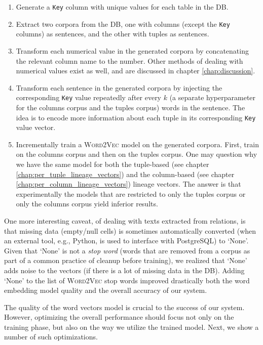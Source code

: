 \begin{enumerate}
    \item Generate a \texttt{Key} column with unique values for each table in the DB.
    \item Extract two corpora from the DB, one with columns (except the \texttt{Key} columns) as sentences, and the other with tuples as sentences.
    \item Transform each numerical value in the generated corpora by concatenating the relevant column name to the number. Other methods of dealing with numerical values exist as well, and are discussed in chapter \ref{chap:discussion}.
    \item Transform each sentence in the generated corpora by injecting the corresponding \texttt{Key} value repeatedly after every $k$ (a separate hyperparameter for the columns corpus and the tuples corpus) words in the sentence. The idea is to encode more information about each tuple in its corresponding \texttt{Key} value vector.
    \item Incrementally train a \textsc{Word2Vec} model on the generated corpora. First, train on the columns corpus and then on the tuples corpus. One may question why we have the same model for both the tuple-based (see chapter \ref{chap:per_tuple_lineage_vectors}) and the column-based (see chapter \ref{chap:per_column_lineage_vectors}) lineage vectors. The answer is that experimentally the models that are restricted to only the tuples corpus or only the columns corpus yield inferior results.
\end{enumerate}
One more interesting caveat, of dealing with texts extracted from relations, is that missing data (empty/null cells) is sometimes automatically converted (when an external tool, e.g., Python, is used to interface with PostgreSQL) to `None'. Given that `None' is not a \textit{stop word} (words that are removed from a corpus as part of a common practice of cleanup before training), we realized that `None' adds noise to the vectors (if there is a lot of missing data in the DB). Adding `None' to the list of \textsc{Word2Vec} stop words improved drastically both the word embedding model quality and the overall accuracy of our system. \\

\par The quality of the word vectors model is crucial to the success of our system. However, optimizing the overall performance should focus not only on the training phase, but also on the way we utilize the trained model. Next, we show a number of such optimizations.\\
